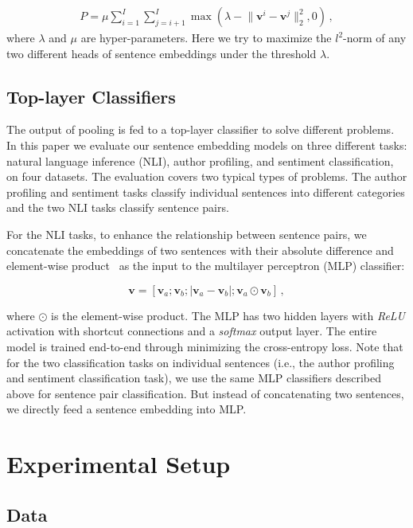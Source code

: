 \documentclass[11pt]{article}
\newcommand{\vect}[1]{\bm{#1}}
\begin{document}
\begin{align}
P = \mu \sum_{i=1}^{I}\sum_{j=i+1}^{I}\max(\lambda - \lVert {\vect v}^i - {\vect v}^j \rVert_2^2, 0) \,,
\end{align}
\noindent where $\lambda$ and $\mu$ are hyper-parameters. Here we try to maximize the $l^2$-norm of any two different heads of sentence embeddings under the threshold $\lambda$.

\subsection{Top-layer Classifiers}

The output of pooling is fed to a top-layer classifier to solve different problems. In this paper we evaluate our sentence embedding models on three different tasks: natural language
inference (NLI), author profiling, and sentiment classification, on four datasets. The evaluation covers two typical types of problems. The author profiling and sentiment tasks classify individual sentences into different categories and the two NLI tasks classify sentence pairs. 

For the NLI tasks, to enhance the relationship between sentence pairs, we concatenate the embeddings of two sentences with their absolute difference and element-wise product~\cite{DBLP:conf/acl/MouMLX0YJ16} as the input to the multilayer perceptron (MLP) classifier:

\begin{equation}
{\vect v} = [{\vect v}_a;{\vect v}_b;\lvert{\vect v}_a - {\vect v}_b\rvert; {\vect v}_a \odot {\vect v}_b] \,,
\end{equation}

\noindent where $\odot$ is the element-wise product. The MLP has two hidden layers with \textit{ReLU} activation with shortcut connections and a \textit{softmax} output layer. The entire model is trained end-to-end through minimizing the cross-entropy loss. Note that for the two classification tasks on individual sentences (i.e., the author profiling and sentiment classification task), we use the same MLP classifiers described above for sentence pair classification. But instead of concatenating two sentences, we directly feed a sentence embedding into MLP.

\section{Experimental Setup}
\label{sec:setup}

\subsection{Data}
\end{document}
